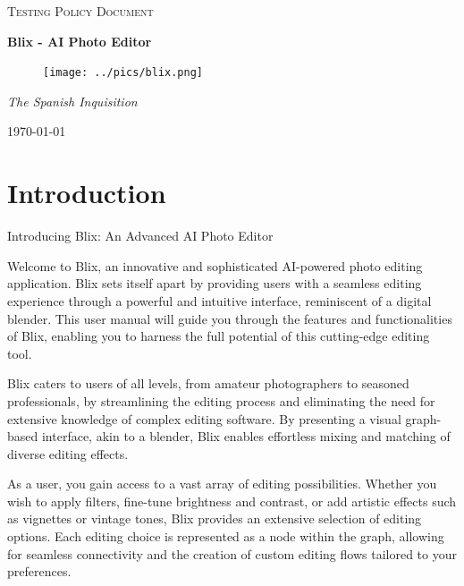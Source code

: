 \documentclass[11pt,a4paper]{article}
\begin{document}
\begin{titlepage}
	\centering
    {\scshape\LARGE Testing Policy Document\par}
    \vspace{1.5cm}
    {\huge\bfseries Blix - AI Photo Editor\par}
    \vspace{2.5cm}
    \begin{figure}[h]
        \centering %
        \texttt{[image: ../pics/blix.png]}
    \end{figure}
    \vspace{2.5cm}
    {\Large\itshape The Spanish Inquisition\par}

    \vfill
    {\large \today\par}
\end{titlepage}

\tableofcontents
\pagebreak


\section*{Introduction}

Introducing Blix: An Advanced AI Photo Editor

Welcome to Blix, an innovative and sophisticated AI-powered photo editing
application. Blix sets itself apart by providing users with a seamless editing
experience through a powerful and intuitive interface, reminiscent of a digital
blender. This user manual will guide you through the features and
functionalities of Blix, enabling you to harness the full potential of this
cutting-edge editing tool.

Blix caters to users of all levels, from amateur photographers to seasoned
professionals, by streamlining the editing process and eliminating the need for
extensive knowledge of complex editing software. By presenting a visual
graph-based interface, akin to a blender, Blix enables effortless mixing and
matching of diverse editing effects.

As a user, you gain access to a vast array of editing possibilities. Whether you
wish to apply filters, fine-tune brightness and contrast, or add artistic
effects such as vignettes or vintage tones, Blix provides an extensive selection
of editing options. Each editing choice is represented as a node within the
graph, allowing for seamless connectivity and the creation of custom editing
flows tailored to your preferences.
\end{document}
